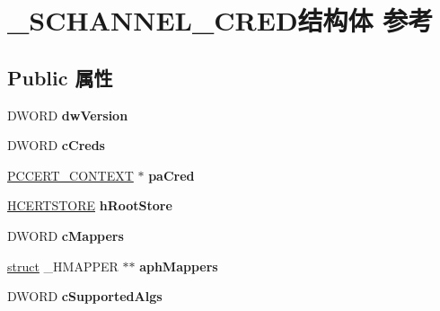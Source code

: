 \hypertarget{struct___s_c_h_a_n_n_e_l___c_r_e_d}{}\section{\+\_\+\+S\+C\+H\+A\+N\+N\+E\+L\+\_\+\+C\+R\+E\+D结构体 参考}
\label{struct___s_c_h_a_n_n_e_l___c_r_e_d}
\subsection*{Public 属性}
\begin{DoxyCompactItemize}
\item 
\mbox{\label{struct___s_c_h_a_n_n_e_l___c_r_e_d_aab33ea219d3eebef31ccee1e6d0d4982}} 
D\+W\+O\+RD {\bfseries dw\+Version}
\item 
\mbox{\label{struct___s_c_h_a_n_n_e_l___c_r_e_d_aad770ef57afdfedd84f2655f96a1c26e}} 
D\+W\+O\+RD {\bfseries c\+Creds}
\item 
\mbox{\label{struct___s_c_h_a_n_n_e_l___c_r_e_d_a947d82d30c2c0d02d34a0295191608a2}} 
\hyperlink{struct___c_e_r_t___c_o_n_t_e_x_t}{P\+C\+C\+E\+R\+T\+\_\+\+C\+O\+N\+T\+E\+XT} $\ast$ {\bfseries pa\+Cred}
\item 
\mbox{\label{struct___s_c_h_a_n_n_e_l___c_r_e_d_a8774be04d01f0a243310a82ca2cb1049}} 
\hyperlink{interfacevoid}{H\+C\+E\+R\+T\+S\+T\+O\+RE} {\bfseries h\+Root\+Store}
\item 
\mbox{\label{struct___s_c_h_a_n_n_e_l___c_r_e_d_abf4bf55b3ddca94c1c8a5768a39b4272}} 
D\+W\+O\+RD {\bfseries c\+Mappers}
\item 
\mbox{\label{struct___s_c_h_a_n_n_e_l___c_r_e_d_aa46b2cd04aa916be544464527fcf46dc}} 
\hyperlink{interfacestruct}{struct} \+\_\+\+H\+M\+A\+P\+P\+ER $\ast$$\ast$ {\bfseries aph\+Mappers}
\item 
\mbox{\label{struct___s_c_h_a_n_n_e_l___c_r_e_d_a5751aacd860b1666cd3f8e3285b76eda}} 
D\+W\+O\+RD {\bfseries c\+Supported\+Algs}
$$
\end{DoxyCompactItemize}
